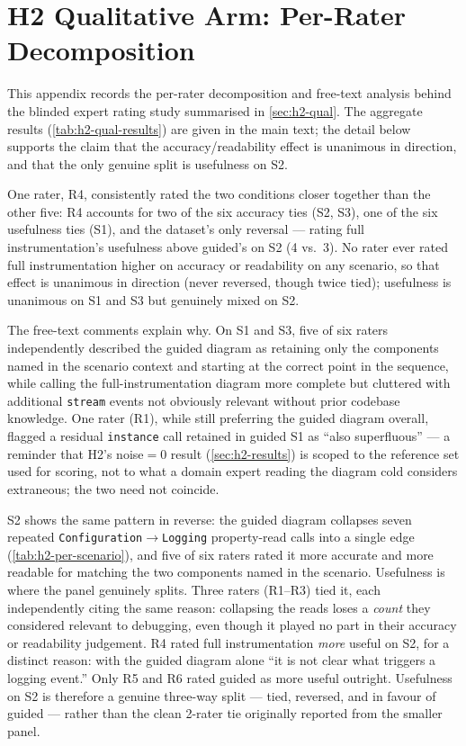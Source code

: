 \section{H2 Qualitative Arm: Per-Rater Decomposition}
\label{sec:appendix-h2-perrater}

This appendix records the per-rater decomposition and free-text analysis
behind the blinded expert rating study summarised in
\cref{sec:h2-qual}. The aggregate results (\cref{tab:h2-qual-results})
are given in the main text; the detail below supports the claim that
the accuracy/readability effect is unanimous in direction, and that the
only genuine split is usefulness on S2.

One rater, R4, consistently rated the two conditions closer together
than the other five: R4 accounts for two of the six accuracy ties (S2,
S3), one of the six usefulness ties (S1), and the dataset's only
reversal --- rating full instrumentation's usefulness above guided's on
S2 (4 vs.\ 3). No rater ever rated full instrumentation higher on
accuracy or readability on any scenario, so that effect is unanimous in
direction (never reversed, though twice tied); usefulness is unanimous
on S1 and S3 but genuinely mixed on S2.

The free-text comments explain why. On S1 and S3, five of six raters
independently described the guided diagram as retaining only the
components named in the scenario context and starting at the correct
point in the sequence, while calling the full-instrumentation diagram
more complete but cluttered with additional \texttt{stream} events not
obviously relevant without prior codebase knowledge. One rater (R1),
while still preferring the guided diagram overall, flagged a residual
\texttt{instance} call retained in guided S1 as ``also superfluous'' ---
a reminder that H2's noise$=0$ result (\cref{sec:h2-results}) is scoped
to the reference set used for scoring, not to what a domain expert reading
the diagram cold considers extraneous; the two need not coincide.

S2 shows the same pattern in reverse: the guided diagram collapses seven
repeated \texttt{Configuration}$\to$\texttt{Logging} property-read calls
into a single edge (\cref{tab:h2-per-scenario}), and five of six raters
rated it more accurate and more readable for matching the two components
named in the scenario. Usefulness is where the panel genuinely splits.
Three raters (R1--R3) tied it, each independently citing the same
reason: collapsing the reads loses a \emph{count} they considered
relevant to debugging, even though it played no part in their accuracy
or readability judgement. R4 rated full instrumentation \emph{more}
useful on S2, for a distinct reason: with the guided diagram alone ``it
is not clear what triggers a logging event.'' Only R5 and R6 rated
guided as more useful outright. Usefulness on S2 is therefore a genuine
three-way split --- tied, reversed, and in favour of guided --- rather
than the clean 2-rater tie originally reported from the smaller panel.

